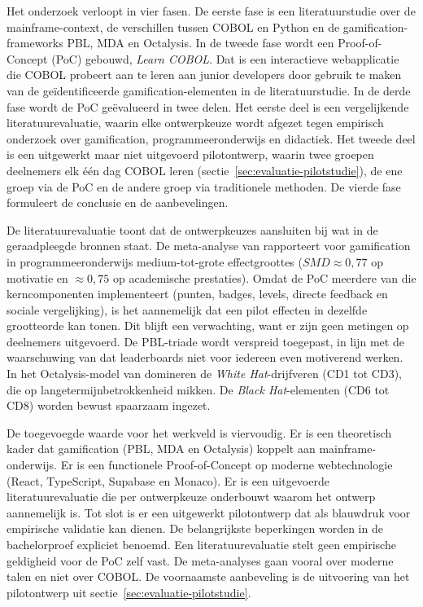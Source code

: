 Het onderzoek verloopt in vier fasen. De eerste fase is een literatuurstudie over de mainframe-context, de verschillen tussen COBOL en Python en de gamification-frameworks PBL, MDA en Octalysis. In de tweede fase wordt een Proof-of-Concept (PoC) gebouwd, \textit{Learn COBOL}. Dat is een interactieve webapplicatie die COBOL probeert aan te leren aan junior developers door gebruik te maken van de geïdentificeerde gamification-elementen in de literatuurstudie. In de derde fase wordt de PoC geëvalueerd in twee delen. Het eerste deel is een vergelijkende literatuurevaluatie, waarin elke ontwerpkeuze wordt afgezet tegen empirisch onderzoek over gamification, programmeeronderwijs en didactiek. Het tweede deel is een uitgewerkt maar niet uitgevoerd pilotontwerp, waarin twee groepen deelnemers elk één dag COBOL leren (sectie~\ref{sec:evaluatie-pilotstudie}), de ene groep via de PoC en de andere groep via traditionele methoden. De vierde fase formuleert de conclusie en de aanbevelingen.

De literatuurevaluatie toont dat de ontwerpkeuzes aansluiten bij wat in de geraadpleegde bronnen staat. De meta-analyse van \textcite{Zhan2022} rapporteert voor gamification in programmeeronderwijs medium-tot-grote effectgroottes (\(SMD \approx 0{,}77\) op motivatie en \(\approx 0{,}75\) op academische prestaties). Omdat de PoC meerdere van die kerncomponenten implementeert (punten, badges, levels, directe feedback en sociale vergelijking), is het aannemelijk dat een pilot effecten in dezelfde grootteorde kan tonen. Dit blijft een verwachting, want er zijn geen metingen op deelnemers uitgevoerd. De PBL-triade wordt verspreid toegepast, in lijn met de waarschuwing van \textcite{KevinWerbach2020} dat leaderboards niet voor iedereen even motiverend werken. In het Octalysis-model van \textcite{Chou2015} domineren de \textit{White Hat}-drijfveren (CD1 tot CD3), die op langetermijnbetrokkenheid mikken. De \textit{Black Hat}-elementen (CD6 tot CD8) worden bewust spaarzaam ingezet.

De toegevoegde waarde voor het werkveld is viervoudig. Er is een theoretisch kader dat gamification (PBL, MDA en Octalysis) koppelt aan mainframe-onderwijs. Er is een functionele Proof-of-Concept op moderne webtechnologie (React, TypeScript, Supabase en Monaco). Er is een uitgevoerde literatuurevaluatie die per ontwerpkeuze onderbouwt waarom het ontwerp aannemelijk is. Tot slot is er een uitgewerkt pilotontwerp dat als blauwdruk voor empirische validatie kan dienen. De belangrijkste beperkingen worden in de bachelorproef expliciet benoemd. Een literatuurevaluatie stelt geen empirische geldigheid voor de PoC zelf vast. De meta-analyses gaan vooral over moderne talen en niet over COBOL. De voornaamste aanbeveling is de uitvoering van het pilotontwerp uit sectie~\ref{sec:evaluatie-pilotstudie}.
